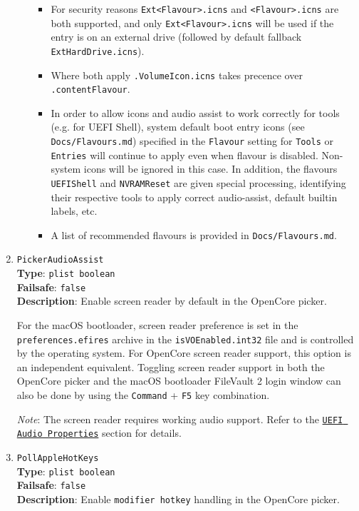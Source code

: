 \documentclass[]{article}
\providecommand{\tightlist}{%
  \setlength{\itemsep}{0pt}\setlength{\parskip}{0pt}}
\begin{document}
\begin{enumerate}
\begin{itemize}
    \begin{itemize}
    \tightlist
      \item For security reasons \texttt{Ext<Flavour>.icns} and \texttt{<Flavour>.icns} are both
      supported, and only \texttt{Ext<Flavour>.icns} will be used if the entry is on an external drive
      (followed by default fallback \texttt{ExtHardDrive.icns}).
      \item Where both apply \texttt{.VolumeIcon.icns} takes precence over \texttt{.contentFlavour}.
      \item In order to allow icons and audio assist to work correctly for tools (e.g. for UEFI Shell),
      system default boot entry icons (see \texttt{Docs/Flavours.md}) specified in the \texttt{Flavour}
      setting for \texttt{Tools} or \texttt{Entries} will continue to apply even when flavour is disabled.
      Non-system icons will be ignored in this  case. In addition, the flavours \texttt{UEFIShell} and
      \texttt{NVRAMReset} are given special processing, identifying their respective tools to apply correct
      audio-assist, default builtin labels, etc.
      \item A list of recommended flavours is provided in \texttt{Docs/Flavours.md}.
    \end{itemize}
    \medskip
  \end{itemize}

\item
  \texttt{PickerAudioAssist}\\
  \textbf{Type}: \texttt{plist\ boolean}\\
  \textbf{Failsafe}: \texttt{false}\\
  \textbf{Description}: Enable screen reader by default in the OpenCore picker.

  For the macOS bootloader, screen reader preference is set in the \texttt{preferences.efires}
  archive in the \texttt{isVOEnabled.int32} file and is controlled by the operating system.
  For OpenCore screen reader support, this option is an independent equivalent.
  Toggling screen reader support in both the OpenCore picker and the macOS bootloader
  FileVault 2 login window can also be done by using the \texttt{Command} + \texttt{F5} key
  combination.

  \emph{Note}: The screen reader requires working audio support. Refer to the
  \hyperref[uefiaudioprops]{\texttt{UEFI Audio Properties}} section for details.

\item
  \texttt{PollAppleHotKeys}\\
  \textbf{Type}: \texttt{plist\ boolean}\\
  \textbf{Failsafe}: \texttt{false}\\
  \textbf{Description}: Enable \texttt{modifier hotkey} handling in the OpenCore picker.


\end{enumerate}
\end{document}
